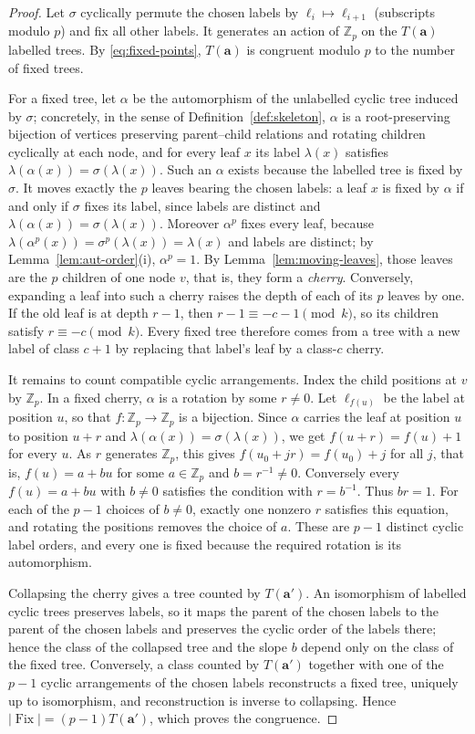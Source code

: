 \documentclass[11pt]{amsart}
\theoremstyle{definition}
\theoremstyle{remark}
\newcommand{\Z}{\mathbb Z}
\DeclareMathOperator{\Fix}{Fix}
\begin{document}
\begin{proof}
Let $\sigma$ cyclically permute the chosen labels by $\ell_i\mapsto\ell_{i+1}$ (subscripts modulo $p$) and fix all other labels.  It generates an action of $\Z_p$ on the $T(\mathbf a)$ labelled trees.  By \eqref{eq:fixed-points}, $T(\mathbf a)$ is congruent modulo $p$ to the number of fixed trees.

For a fixed tree, let $\alpha$ be the automorphism of the unlabelled cyclic tree induced by $\sigma$; concretely, in the sense of Definition~\ref{def:skeleton}, $\alpha$ is a root-preserving bijection of vertices preserving parent--child relations and rotating children cyclically at each node, and for every leaf $x$ its label $\lambda(x)$ satisfies $\lambda(\alpha(x))=\sigma(\lambda(x))$.  Such an $\alpha$ exists because the labelled tree is fixed by $\sigma$.  It moves exactly the $p$ leaves bearing the chosen labels: a leaf $x$ is fixed by $\alpha$ if and only if $\sigma$ fixes its label, since labels are distinct and $\lambda(\alpha(x))=\sigma(\lambda(x))$.  Moreover $\alpha^p$ fixes every leaf, because $\lambda(\alpha^p(x))=\sigma^p(\lambda(x))=\lambda(x)$ and labels are distinct; by Lemma~\ref{lem:aut-order}(i), $\alpha^p=1$.  By Lemma~\ref{lem:moving-leaves}, those leaves are the $p$ children of one node $v$, that is, they form a \emph{cherry}.  Conversely, expanding a leaf into such a cherry raises the depth of each of its $p$ leaves by one.  If the old leaf is at depth $r-1$, then $r-1\equiv-c-1\pmod k$, so its children satisfy $r\equiv-c\pmod k$.  Every fixed tree therefore comes from a tree with a new label of class $c+1$ by replacing that label's leaf by a class-$c$ cherry.

It remains to count compatible cyclic arrangements.  Index the child positions at $v$ by $\Z_p$.  In a fixed cherry, $\alpha$ is a rotation by some $r\ne0$.  Let $\ell_{f(u)}$ be the label at position $u$, so that $f:\Z_p\to\Z_p$ is a bijection.  Since $\alpha$ carries the leaf at position $u$ to position $u+r$ and $\lambda(\alpha(x))=\sigma(\lambda(x))$, we get $f(u+r)=f(u)+1$ for every $u$.  As $r$ generates $\Z_p$, this gives $f(u_0+jr)=f(u_0)+j$ for all $j$, that is, $f(u)=a+bu$ for some $a\in\Z_p$ and $b=r^{-1}\ne0$.  Conversely every $f(u)=a+bu$ with $b\ne0$ satisfies the condition with $r=b^{-1}$.  Thus $br=1$.  For each of the $p-1$ choices of $b\ne0$, exactly one nonzero $r$ satisfies this equation, and rotating the positions removes the choice of $a$.  These are $p-1$ distinct cyclic label orders, and every one is fixed because the required rotation is its automorphism.

Collapsing the cherry gives a tree counted by $T(\mathbf a')$.  An isomorphism of labelled cyclic trees preserves labels, so it maps the parent of the chosen labels to the parent of the chosen labels and preserves the cyclic order of the labels there; hence the class of the collapsed tree and the slope $b$ depend only on the class of the fixed tree.  Conversely, a class counted by $T(\mathbf a')$ together with one of the $p-1$ cyclic arrangements of the chosen labels reconstructs a fixed tree, uniquely up to isomorphism, and reconstruction is inverse to collapsing.  Hence $|\Fix|=(p-1)T(\mathbf a')$, which proves the congruence.
\end{proof}
\end{document}
